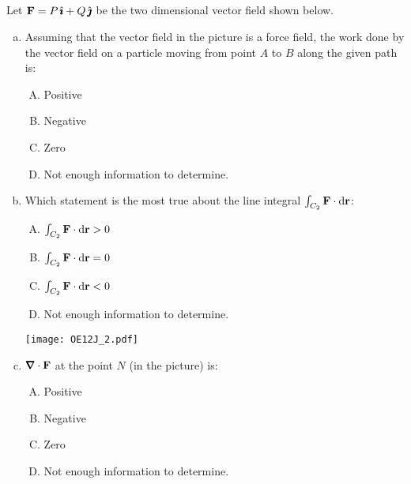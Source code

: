 

\subsection*{\Conceptual}

\begin{question}[M317 2012J] %
Let $\mathbf{F} = P\,\hat{\pmb{\imath}} + Q\,\hat{\pmb{\jmath}}$ be the two dimensional vector field
shown below.


\begin{enumerate}[(a)]
\item
Assuming that the vector field in the picture is a force field, the work 
done by the vector field on a particle moving from point $A$ to $B$ 
along the given path is:
\begin{enumerate}[(A)]
\item  Positive
\item  Negative
\item  Zero
\item Not enough information to determine.
\end{enumerate}

\item
Which statement is the most true about the line integral
$\int_{C_2} \mathbf{F}\cdot\mathrm{d}\mathbf{r}$:
\begin{enumerate}[(A)]
\item  $\int_{C_2} \mathbf{F}\cdot\mathrm{d}\mathbf{r}>0$
\item  $\int_{C_2} \mathbf{F}\cdot\mathrm{d}\mathbf{r}=0$
\item  $\int_{C_2} \mathbf{F}\cdot\mathrm{d}\mathbf{r}<0$
\item Not enough information to determine.
\end{enumerate}

\goodbreak

\begin{center}
    \texttt{[image: OE12J\_2.pdf]}
\end{center}

\item 
$\vnabla\cdot\vF$ at the point $N$ (in the picture) is:
\begin{enumerate}[(A)]
\item Positive
\item Negative
\item Zero
\item Not enough information to determine.
\end{enumerate}


\end{enumerate}
\end{question}
